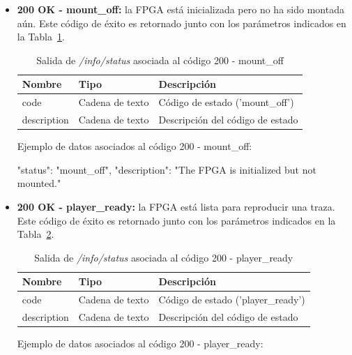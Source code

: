 \begin{itemize}
{\begin{minipage}{\textwidth}
\begin{code}[language=json]
{
  "status": "init_off",
  "description": "The FPGA is not configured either as player or as recorder yet."
}
\end{code}
\end{minipage}
}

\item{\textbf{200 OK - mount\_off:} la \gls{FPGA} está inicializada pero no ha sido montada aún.
Este código de éxito es retornado junto con los parámetros indicados en la Tabla~\ref{extra:api:infostatus:mountoff}.
\begin{table}[H]
\centering
\begin{tabular}{|l|l|l|}
\hline
\rowcolor[HTML]{F5F5F5}
\textbf{Nombre}  & \textbf{Tipo}   & \textbf{Descripción}               \\ \hline
code             & Cadena de texto & Código de estado ('mount\_off')    \\ \hline
description      & Cadena de texto & Descripción del código de estado   \\ \hline
\end{tabular}
\caption{Salida de \textit{/info/status} asociada al código 200 - mount\_off}
\label{extra:api:infostatus:mountoff}
\end{table}
\begin{minipage}{\textwidth}
Ejemplo de datos asociados al código 200 - mount\_off:

\begin{code}[language=json]
{
  "status": "mount_off",
  "description": "The FPGA is initialized but not mounted."
}
\end{code}
\end{minipage}
}

\item{\textbf{200 OK - player\_ready:} la \gls{FPGA} está lista para reproducir una \gls{traza}.
Este código de éxito es retornado junto con los parámetros indicados en la Tabla~\ref{extra:api:infostatus:playerready}.
\begin{table}[H]
\centering
\begin{tabular}{|l|l|l|}
\hline
\rowcolor[HTML]{F5F5F5}
\textbf{Nombre}  & \textbf{Tipo}   & \textbf{Descripción}               \\ \hline
code             & Cadena de texto & Código de estado ('player\_ready') \\ \hline
description      & Cadena de texto & Descripción del código de estado   \\ \hline
\end{tabular}
\caption{Salida de \textit{/info/status} asociada al código 200 - player\_ready}
\label{extra:api:infostatus:playerready}
\end{table}
\begin{minipage}{\textwidth}
Ejemplo de datos asociados al código 200 - player\_ready:


\end{minipage}}
\end{itemize}
